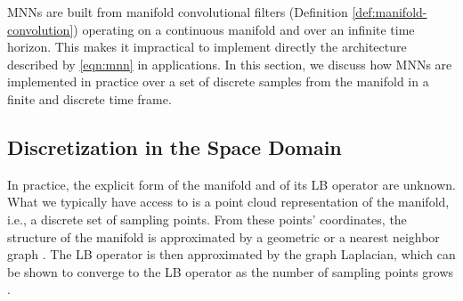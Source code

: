 
MNNs are built from manifold convolutional filters (Definition \ref{def:manifold-convolution}) operating on a continuous manifold and over an infinite time horizon. 
This makes it impractical to implement directly the architecture described by \eqref{eqn:mnn} in applications. In this section, we discuss how MNNs are implemented in practice over a set of discrete samples from the manifold in a finite and discrete time frame.

\subsection{{Discretization in the Space Domain}}


In practice, the explicit form of the manifold and of its LB operator are unknown. What we typically have access to is a point cloud representation of the manifold, i.e., a discrete set of sampling points.
From these points' coordinates, the structure of the manifold is approximated by a geometric or a nearest neighbor graph \cite{dunson2021spectral,belkin2008towards,calder2019improved}. The LB operator is then approximated by the graph Laplacian,
which can be shown to converge to the LB operator as the number of sampling points grows \cite{dunson2021spectral} \cite{calder2019improved}.

